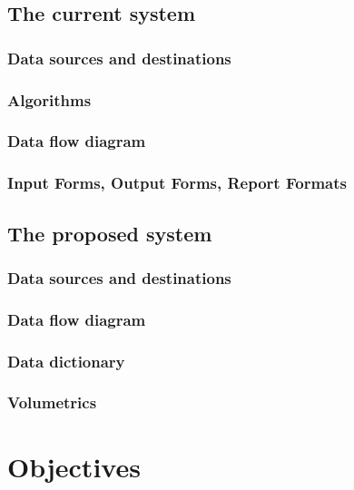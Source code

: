 \subsection{The current system}

\subsubsection{Data sources and destinations}

\subsubsection{Algorithms}

\subsubsection{Data flow diagram}

\subsubsection{Input Forms, Output Forms, Report Formats}

\subsection{The proposed system}

\subsubsection{Data sources and destinations}

\subsubsection{Data flow diagram}

\subsubsection{Data dictionary}

\subsubsection{Volumetrics}

\section{Objectives}

